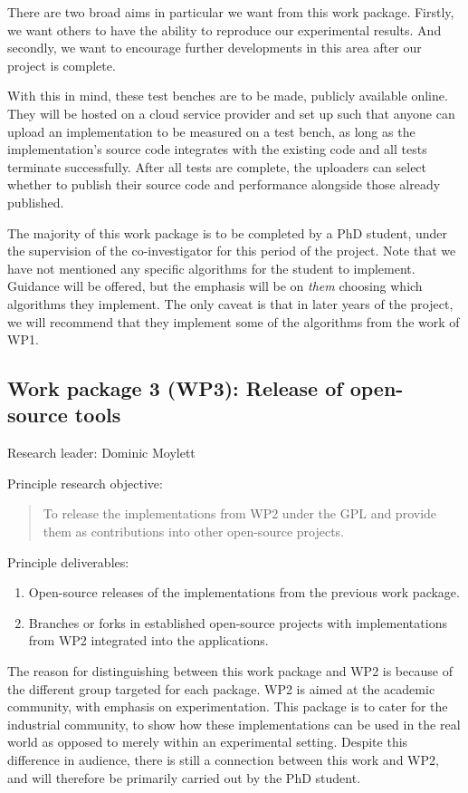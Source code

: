 \documentclass[a4paper,11pt]{article}
\begin{document}
    There are two broad aims in particular we want from this work package. Firstly, we want others to have the ability to reproduce our experimental results. And secondly, we want to encourage further developments in this area after our project is complete.

    With this in mind, these test benches are to be made, publicly available online. They will be hosted on a cloud service provider and set up such that anyone can upload an implementation to be measured on a test bench, as long as the implementation's source code integrates with the existing code and all tests terminate successfully. After all tests are complete, the uploaders can select whether to publish their source code and performance alongside those already published.

    The majority of this work package is to be completed by a PhD student, under the supervision of the co-investigator for this period of the project. Note that we have not mentioned any specific algorithms for the student to implement. Guidance will be offered, but the emphasis will be on \textit{them} choosing which algorithms they implement. The only caveat is that in later years of the project, we will recommend that they implement some of the algorithms from the work of WP1.

    \subsection*{Work package 3 (WP3): Release of open-source tools}

    Research leader: Dominic Moylett

    Principle research objective:
    \begin{quote}
        To release the implementations from WP2 under the GPL and provide them as contributions into other open-source projects.
    \end{quote}

    Principle deliverables:
    \begin{enumerate}
        \item Open-source releases of the implementations from the previous work package.
        \item Branches or forks in established open-source projects with implementations from WP2 integrated into the applications.
    \end{enumerate}

    The reason for distinguishing between this work package and WP2 is because of the different group targeted for each package. WP2 is aimed at the academic community, with emphasis on experimentation. This package is to cater for the industrial community, to show how these implementations can be used in the real world as opposed to merely within an experimental setting. Despite this difference in audience, there is still a connection between this work and WP2, and will therefore be primarily carried out by the PhD student.
\end{document}

